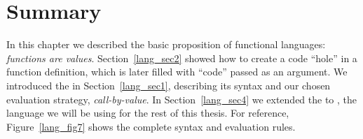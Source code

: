 \documentclass[12pt]{report}
\begin{document}




\section{Summary}
\label{lang_sec5}

In this chapter we described the basic proposition of functional
languages: \emph{functions are values}. Section~\ref{lang_sec2} showed
how to create a code ``hole'' in a function definition, which is later
filled with ``code'' passed as an argument. We introduced the \lamA in
Section~\ref{lang_sec1}, describing its syntax and our chosen
evaluation strategy, \emph{call-by-value}. In Section~\ref{lang_sec4}
we extended the \lamA to \lamC, the language we will be using for the
rest of this thesis. For reference, Figure~\ref{lang_fig7} shows the
complete syntax and evaluation rules.

\end{document}
